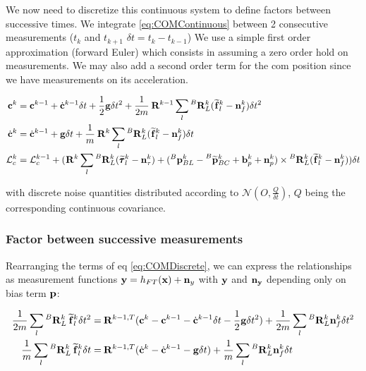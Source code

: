 \documentclass[11pt]{article}
\newcommand{\Rot}[2]{\prescript{#1}{}{\bfR}_{#2}}
\newcommand{\noise}{\bfn}
\newcommand{\bias}{\bfb}
\newcommand{\posi}[2]{\prescript{#1}{}{\bfp}_{#2}}
\newcommand{\posim}[2]{\prescript{#1}{}{\widetilde{\bfp}}_{#2}}
\newcommand{\forcem}[2]{\prescript{#1}{}{\widetilde{\bff}}_{#2}}
\newcommand{\torquem}[2]{\prescript{#1}{}{\widetilde{\pmb{\tau}}}_{#2}}
\newcommand{\AM}{\mathcal{L}}
\newcommand{\COM}{\bfc}
\newcommand{\COMd}{\dot{\bfc}}
\begin{document}
We now need to discretize this continuous system to define factors between successive times. We integrate \ref{eq:COMContinuous} between 2 consecutive measurements ($t_k$ and $t_{k+1}$ $\delta t = t_{k} - t_{k-1}$)  We use a simple first order approximation (forward Euler) which consists in assuming a zero order hold on measurements. We may also add a second order term for the com position since we have measurements on its acceleration.

\begin{equation}
\begin{split}
\COM^{k} &= \COM^{k-1} + \COMd^{k-1} \delta t 
+ \frac{1}{2} \bfg \delta t^2 + \frac{1}{2m} \Rot{}{}^{k-1} \sum_l \Rot{B}{L}^{k} (\forcem{}{l}^{k} - \noise_f^{k}) \delta t^2
\\
\COMd^{k}&= \COMd^{k-1} + \bfg \delta t + \frac{1}{m} \Rot{}{}^{k} \sum_l \Rot{B}{L}^{k} (\forcem{}{l}^{k} - \noise_f^{k}) \delta t 
\\
\AM_c^{k} &= \AM_c^{k-1} +  ( 
\Rot{}{}^{k}\sum_l \Rot{B}{L}^{k}(\torquem{}{l}^{k} - \noise_{\tau}^{k}) + (\posi{B}{BL}^{k} - \posim{B}{BC}^{k} + \bias_{p}^{k} + \noise_p^{k}) \times \Rot{B}{L}^{k}(\forcem{}{l}^{k} - \noise_f^{k}) 
) \delta t
\end{split}
\label{eq:COMDiscrete}
\end{equation}

with discrete noise quantities distributed according to \( \mathcal{N}(O,\frac{Q}{\delta t}) \), \(Q\) being the corresponding continuous covariance.


\subsubsection{Factor between successive measurements}
Rearranging the terms of eq \ref{eq:COMDiscrete}, we can express the relationships as measurement functions $\bfy = h_{FT}(\bfx) + \noise_y$ with ${\bf y}$ and $\noise_{\bfy}$ depending only on bias term ${\bf p}$:

\begin{small}
\begin{equation}
\begin{split}
	\frac{1}{2m}\sum_l \Rot{B}{L}^{k} \forcem{}{l}^{k}\delta t^2 =& 
	\Rot{}{}^{k-1,T}(\COM^{k} - \COM^{k-1} - \COMd^{k-1} \delta t - \frac{1}{2} \bfg \delta t^2)
	+ \frac{1}{2m}\sum_l \Rot{B}{L}^{k} \noise_f^{k}\delta t^2
	\\
	\frac{1}{m} \sum_l \Rot{B}{L}^{k} \forcem{}{l}^{k} \delta t =& \Rot{}{}^{k-1,T}(\COMd^{k} - \COMd^{k-1} - \bfg \delta t) 
	+ \frac{1}{m} \sum_l \Rot{B}{L}^{k} \noise_f^{k} \delta t	
\end{split}
\label{eq:CCdFactor}
\end{equation}
\end{small}
\end{document}
